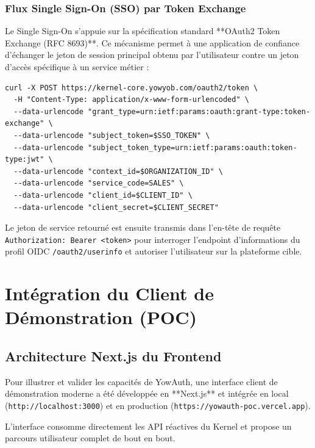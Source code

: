 \documentclass[
]{IPLeiriaThesis}
\newcommand{\code}[1]{\texttt{\small #1}}
\begin{document}
\subsection{Flux Single Sign-On (SSO) par Token Exchange}
Le Single Sign-On s'appuie sur la spécification standard **OAuth2 Token Exchange (RFC 8693)**. Ce mécanisme permet à une application de confiance d'échanger le jeton de session principal obtenu par l'utilisateur contre un jeton d'accès spécifique à un service métier :
\begin{lstlisting}[caption={Payload d'échange auprès de /oauth2/token}]
curl -X POST https://kernel-core.yowyob.com/oauth2/token \
  -H "Content-Type: application/x-www-form-urlencoded" \
  --data-urlencode "grant_type=urn:ietf:params:oauth:grant-type:token-exchange" \
  --data-urlencode "subject_token=$SSO_TOKEN" \
  --data-urlencode "subject_token_type=urn:ietf:params:oauth:token-type:jwt" \
  --data-urlencode "context_id=$ORGANIZATION_ID" \
  --data-urlencode "service_code=SALES" \
  --data-urlencode "client_id=$CLIENT_ID" \
  --data-urlencode "client_secret=$CLIENT_SECRET"
\end{lstlisting}
Le jeton de service retourné est ensuite transmis dans l'en-tête de requête \code{Authorization: Bearer <token>} pour interroger l'endpoint d'informations du profil OIDC \code{/oauth2/userinfo} et autoriser l'utilisateur sur la plateforme cible.

\chapter{Intégration du Client de Démonstration (POC)}

\section{Architecture Next.js du Frontend}
Pour illustrer et valider les capacités de YowAuth, une interface client de démonstration moderne a été développée en **Next.js** et intégrée en local (\code{http://localhost:3000}) et en production (\code{https://yowauth-poc.vercel.app}).

L'interface consomme directement les API réactives du Kernel et propose un parcours utilisateur complet de bout en bout.
\end{document}
